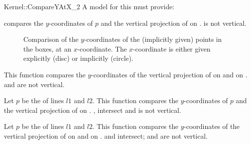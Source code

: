 \begin{ccRefFunctionObjectConcept}{Kernel::CompareYAtX_2}
A model for this must provide:


        {compares the $y$-coordinates of $p$ and the vertical projection
         of  on %
         .
         \ccPrecond {} is not vertical.
         }

\begin{ccTexOnly}
\begin{figure}[h]
\centerline{}
\caption{Comparison of the $y$-coordinates of the (implicitly given)
         points in the boxes, at an $x$-coordinate. The $x$-coordinate
         is either given explicitly (disc) or implicitly (circle).
         \label{fig-compare22}}
\end{figure} 
\end{ccTexOnly} 


{This function compares the $y$-coordinates of the vertical projection 
 of  on  and on %
 .
\ccPrecond {} and  are not vertical.}

      {Let $p$ be the  of lines $l1$ and $l2$.
       This function compares the $y$-coordinates of $p$ and 
       the vertical projection of  on %
       .
       \ccPrecond {},  intersect and  is not
       vertical.
      }



{Let $p$ be the  of lines $l1$ and $l2$. This function 
 compares the $y$-coordinates of the vertical projection of  on 
  and on %
 .
 \ccPrecond {} and  intersect;  and
  are not vertical.
}


\end{ccRefFunctionObjectConcept}
